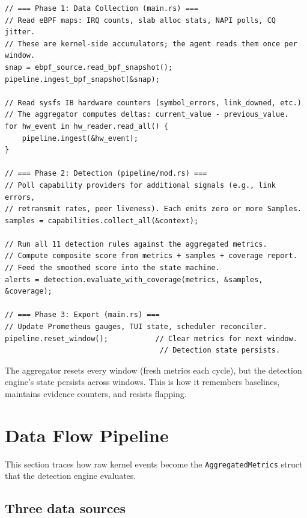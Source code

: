 \documentclass[11pt]{article}
\begin{document}
\begin{lstlisting}[caption={Annotated per-window execution flow}]
// === Phase 1: Data Collection (main.rs) ===
// Read eBPF maps: IRQ counts, slab alloc stats, NAPI polls, CQ jitter.
// These are kernel-side accumulators; the agent reads them once per window.
snap = ebpf_source.read_bpf_snapshot();
pipeline.ingest_bpf_snapshot(&snap);

// Read sysfs IB hardware counters (symbol_errors, link_downed, etc.)
// The aggregator computes deltas: current_value - previous_value.
for hw_event in hw_reader.read_all() {
    pipeline.ingest(&hw_event);
}

// === Phase 2: Detection (pipeline/mod.rs) ===
// Poll capability providers for additional signals (e.g., link errors,
// retransmit rates, peer liveness). Each emits zero or more Samples.
samples = capabilities.collect_all(&context);

// Run all 11 detection rules against the aggregated metrics.
// Compute composite score from metrics + samples + coverage report.
// Feed the smoothed score into the state machine.
alerts = detection.evaluate_with_coverage(metrics, &samples, &coverage);

// === Phase 3: Export (main.rs) ===
// Update Prometheus gauges, TUI state, scheduler reconciler.
pipeline.reset_window();           // Clear metrics for next window.
                                    // Detection state persists.
\end{lstlisting}

\begin{keyinsight}
  The aggregator resets every window (fresh metrics each cycle), but the
  detection engine's state persists across windows. This is how it remembers
  baselines, maintains evidence counters, and resists flapping.
\end{keyinsight}

\section{Data Flow Pipeline}
\label{sec:data-flow}

This section traces how raw kernel events become the
\texttt{AggregatedMetrics} struct that the detection engine evaluates.

\subsection{Three data sources}
\end{document}
